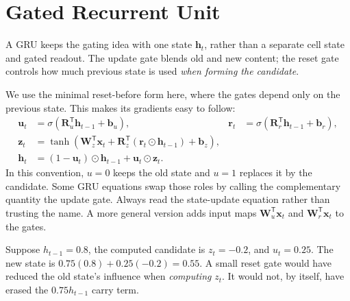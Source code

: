 \documentclass[11pt, oneside]{book}
\newcommand{\T}{^{\mathsf{T}}}           %
\let\originalsection\section
\renewcommand{\section}{\Needspace{7\baselineskip}\originalsection}
\begin{document}
\section{Gated Recurrent Unit}\label{sec:source-3-8}
A GRU keeps the gating idea with one state $\mathbf{h}_t$, rather than a separate cell state and gated readout. The update gate blends old and new content; the reset gate controls how much previous state is used \emph{when forming the candidate}.

We use the minimal reset-before form here, where the gates depend only on the previous state. This makes its gradients easy to follow:
\begin{align}
 \mathbf{u}_t&=\sigma(\mathbf{R}_u\T\mathbf{h}_{t-1}+\mathbf{b}_u),&
 \mathbf{r}_t&=\sigma(\mathbf{R}_r\T\mathbf{h}_{t-1}+\mathbf{b}_r),\\
 \mathbf{z}_t&=\tanh\!\left(\mathbf{W}_z\T\mathbf{x}_t+
            \mathbf{R}_z\T(\mathbf{r}_t\odot\mathbf{h}_{t-1})+\mathbf{b}_z\right),\\
 \mathbf{h}_t&=(1-\mathbf{u}_t)\odot\mathbf{h}_{t-1}+\mathbf{u}_t\odot\mathbf{z}_t.
 \label{eq:gru-update}
\end{align}
In this convention, $u=0$ keeps the old state and $u=1$ replaces it by the candidate. Some GRU equations swap those roles by calling the complementary quantity the update gate. Always read the state-update equation rather than trusting the name. A more general version adds input maps $\mathbf{W}_u\T\mathbf{x}_t$ and $\mathbf{W}_r\T\mathbf{x}_t$ to the gates.

\begin{exbox}[title={Reset and update do different jobs}]
Suppose $h_{t-1}=0.8$, the computed candidate is $z_t=-0.2$, and $u_t=0.25$. The new state is $0.75(0.8)+0.25(-0.2)=0.55$. A small reset gate would have reduced the old state's influence when \emph{computing} $z_t$. It would not, by itself, have erased the $0.75h_{t-1}$ carry term.
\end{exbox}
\end{document}
